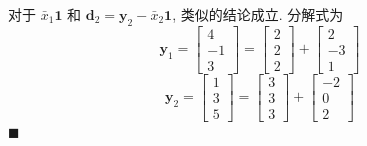 对于 $\bar{x}_{1}\mathbf{1}$ 和 $\mathbf{d}_{2}=\mathbf{y}_{2}-\bar{x}_{2}\mathbf{1}$, 类似的结论成立. 分解式为
\[
\mathbf{y}_{1}=\begin{bmatrix}4\\-1\\3\end{bmatrix}=\begin{bmatrix}2\\2\\2\end{bmatrix}+\begin{bmatrix}2\\-3\\1\end{bmatrix}
\]
\[
\mathbf{y}_{2}=\begin{bmatrix}1\\3\\5\end{bmatrix}=\begin{bmatrix}3\\3\\3\end{bmatrix}+\begin{bmatrix}-2\\0\\2\end{bmatrix}
\]
\hfill$\blacksquare$
